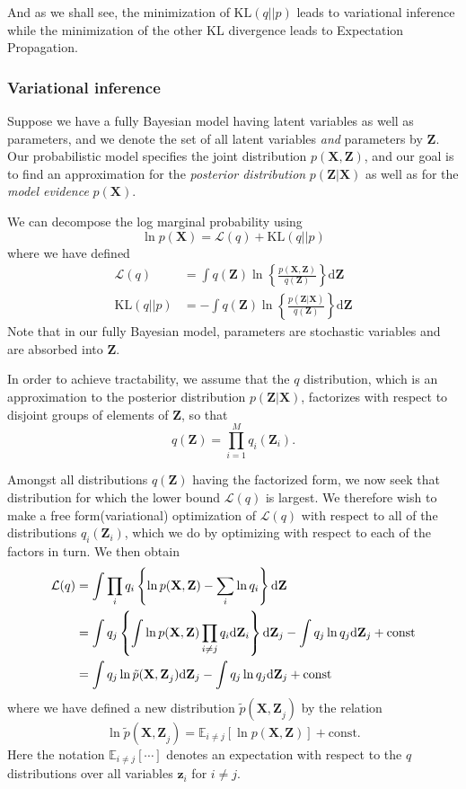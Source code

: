 \documentclass[a4paper]{report}
\newcommand{\ud}{\mathrm{d}}
\newcommand{\up}{\mathrm}
\renewcommand{\bf}{\mathbf}
\renewcommand{\cal}{\mathcal}
\newcommand{\bb}{\mathbb}
\newcommand{\imp}[1]{{\color{blue}\textit{#1}}}
\begin{document}
And as we shall see, the minimization of $\up{KL}(q||p)$ leads to variational inference while the minimization of the other KL divergence leads to Expectation Propagation.
\subsubsection{Variational inference}
Suppose we have a fully Bayesian model having latent variables as well as parameters, and we denote the set of all latent variables \imp{and} parameters by $\bf{Z}$. Our probabilistic model specifies the joint distribution $p(\bf{X,Z})$, and our goal is to find an approximation for the \imp{posterior distribution} $p(\bf{Z|X})$ as well as for the \imp{model evidence} $p(\bf{X})$.

We can decompose the log marginal probability using
\begin{equation}
	\ln p(\bf{X}) = \cal{L}(q) + \up{KL}(q||p)
\end{equation}
where we have defined
\begin{align}
	\cal{L}(q) &= \int q(\bf{Z})\ln\left\{ \frac{p(\bf{X,Z})}{q(\bf{Z})} \right\} \ud \bf{Z}\\
	\up{KL}(q||p) &= - \int q(\bf{Z}) \ln \left\{  \frac{p(\bf{Z|X})}{q(\bf{Z})}  \right\} \ud \bf{Z}
\end{align}
Note that in our fully Bayesian model, parameters are stochastic variables and are absorbed into $\bf{Z}$. 

In order to achieve tractability, we assume that the $q$ distribution, which is an approximation to the posterior distribution $p(\bf{Z|X})$, factorizes with respect to disjoint groups of elements of $\bf{Z}$, so that
\begin{equation}
	q(\bf{Z}) = \prod_{i=1}^M q_i(\bf{Z}_i).
\end{equation}

Amongst all distributions $q(\bf{Z})$ having the factorized form, we now seek that distribution for which the lower bound $\cal{L}(q)$ is largest. We therefore wish to make a free form(variational) optimization of $\cal{L}(q)$ with respect to all of  the distributions $q_i(\bf{Z}_i)$, which we do by optimizing with respect to each of the factors in turn. We then obtain
\begin{align}
	\cal{L}(q) &= \int \prod_i q_i \left\{ \ln p(\bf{X,Z}) - \sum_i \ln q_i \right\} \ud \bf{Z} \notag \\
	&= \int q_j \left\{ \int \ln p(\bf{X,Z})\prod_{i \neq j} q_i \ud \bf{Z}_i \right\} \ud \bf{Z}_j - \int q_j \ln q_j \ud \bf{Z}_j + \text{const} \notag \\
	&= \int q_j \ln \tilde{p}(\bf{X,Z}_j)\ud \bf{Z}_j - \int q_j \ln q_j \ud \bf{Z}_j + \up{const}
\end{align}
where we have defined a new distribution $\tilde{p}(\bf{X,Z}_j)$ by the relation
\begin{equation}
	\ln \tilde{p}(\bf{X,Z}_j) = \bb{E}_{i \neq j}[\ln p(\bf{X,Z})] + \up{const}.
\end{equation}
Here the notation $\bb{E}_{i \neq j}[\cdots]$ denotes an expectation with respect to the $q$ distributions over all variables $\bf{z}_i$ for $i \neq j$.
\end{document}
